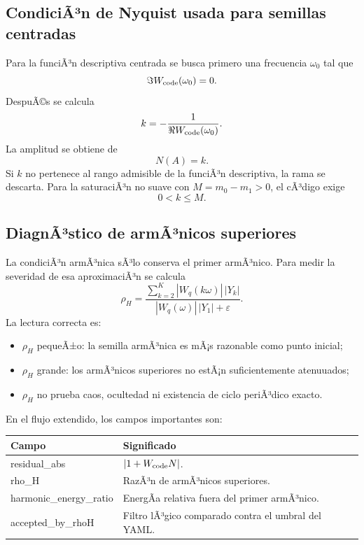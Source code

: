 \documentclass[11pt]{article}
\DeclareRobustCommand{\codepath}[1]{\begingroup\Urlmuskip=0mu plus 2mu\path{#1}\endgroup}
\def\codepath#1{#1}%
\begin{document}
\subsection{CondiciÃ³n de Nyquist usada para semillas centradas}

Para la funciÃ³n descriptiva centrada se busca primero una frecuencia \(\omega_0\) tal que
\begin{equation}
\Im W_{\rm code}(\omega_0)=0.
\end{equation}
DespuÃ©s se calcula
\begin{equation}
k=-\frac{1}{\Re W_{\rm code}(\omega_0)}.
\end{equation}
La amplitud se obtiene de
\begin{equation}
N(A)=k.
\end{equation}
Si \(k\) no pertenece al rango admisible de la funciÃ³n descriptiva, la rama se descarta. Para la saturaciÃ³n no suave con \(M=m_0-m_1>0\), el cÃ³digo exige
\begin{equation}
0<k\leq M.
\end{equation}

\subsection{DiagnÃ³stico de armÃ³nicos superiores}

La condiciÃ³n armÃ³nica sÃ³lo conserva el primer armÃ³nico. Para medir la severidad de esa aproximaciÃ³n se calcula
\begin{equation}
\rho_H=
\frac{\displaystyle\sum_{k=2}^{K}|W_q(k\omega)|\,|Y_k|}
{|W_q(\omega)|\,|Y_1|+\varepsilon}.
\end{equation}
La lectura correcta es:
\begin{itemize}
\item \(\rho_H\) pequeÃ±o: la semilla armÃ³nica es mÃ¡s razonable como punto inicial;
\item \(\rho_H\) grande: los armÃ³nicos superiores no estÃ¡n suficientemente atenuuados;
\item \(\rho_H\) no prueba caos, ocultedad ni existencia de ciclo periÃ³dico exacto.
\end{itemize}

En el flujo extendido, los campos importantes son:
\begin{center}
\begin{tabular}{@{}ll@{}}
\toprule
Campo & Significado\\
\midrule
\codepath{residual_abs} & \(|1+W_{\rm code}N|\).\\
\codepath{rho_H} & RazÃ³n de armÃ³nicos superiores.\\
\codepath{harmonic_energy_ratio} & EnergÃ­a relativa fuera del primer armÃ³nico.\\
\codepath{accepted_by_rhoH} & Filtro lÃ³gico comparado contra el umbral del YAML.\\
\bottomrule
\end{tabular}
\end{center}
\end{document}
